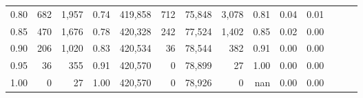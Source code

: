 \begin{tabular}{rrrrrrrrrrrrrr}
0.80 &      682 &  1,957 &  0.74 &  419,858 &      712 &  75,848 &   3,078 &  0.81 &  0.04 &      0.01 \\
0.85 &      470 &  1,676 &  0.78 &  420,328 &      242 &  77,524 &   1,402 &  0.85 &  0.02 &      0.00 \\
0.90 &      206 &  1,020 &  0.83 &  420,534 &       36 &  78,544 &     382 &  0.91 &  0.00 &      0.00 \\
0.95 &       36 &    355 &  0.91 &  420,570 &        0 &  78,899 &      27 &  1.00 &  0.00 &      0.00 \\
1.00 &        0 &     27 &  1.00 &  420,570 &        0 &  78,926 &       0 &   nan &  0.00 &      0.00 \\
\bottomrule
\end{tabular}
